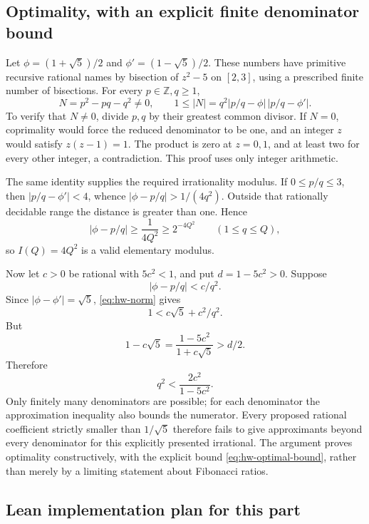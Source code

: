 \subsection{Optimality, with an explicit finite denominator bound}

Let \(\phi=(1+\sqrt5)/2\) and \(\phi'=(1-\sqrt5)/2\).
These numbers have primitive recursive rational names by bisection of
\(z^2-5\) on \([2,3]\), using a prescribed finite number of bisections.
For every \(p\in\mathbb Z,q\ge1\),
\begin{equation}\label{eq:hw-norm}
 N=p^2-pq-q^2\ne0,\qquad
 1\le|N|=q^2|p/q-\phi|\,|p/q-\phi'|.
\end{equation}
To verify that \(N\ne0\), divide \(p,q\) by their greatest common divisor.
If \(N=0\), coprimality would force the reduced denominator to be one,
and an integer \(z\) would satisfy \(z(z-1)=1\).  The product is zero
at \(z=0,1\), and at least two for every other integer, a contradiction.
This proof uses only integer arithmetic.

The same identity supplies the required irrationality modulus.  If
\(0\le p/q\le3\), then \(|p/q-\phi'|<4\), whence
\(|\phi-p/q|>1/(4q^2)\).  Outside that rationally decidable range the
distance is greater than one.  Hence
\[
 |\phi-p/q|\ge\frac1{4Q^2}\ge2^{-4Q^2}
 \qquad(1\le q\le Q),
\]
so \(I(Q)=4Q^2\) is a valid elementary modulus.

Now let \(c>0\) be rational with \(5c^2<1\), and put
\(d=1-5c^2>0\).  Suppose
\[
 |\phi-p/q|<c/q^2.
\]
Since \(|\phi-\phi'|=\sqrt5\), \eqref{eq:hw-norm} gives
\[
 1<c\sqrt5+c^2/q^2.
\]
But
\[
 1-c\sqrt5=\frac{1-5c^2}{1+c\sqrt5}>d/2.
\]
Therefore
\begin{equation}\label{eq:hw-optimal-bound}
 q^2<\frac{2c^2}{1-5c^2}.
\end{equation}
Only finitely many denominators are possible; for each denominator the
approximation inequality also bounds the numerator.  Every proposed rational
coefficient strictly smaller than \(1/\sqrt5\) therefore fails to give
approximants beyond every denominator for this explicitly presented irrational.
The argument proves optimality constructively, with the explicit bound
\eqref{eq:hw-optimal-bound}, rather than merely by a limiting statement about
Fibonacci ratios.

\subsection{Lean implementation plan for this part}


